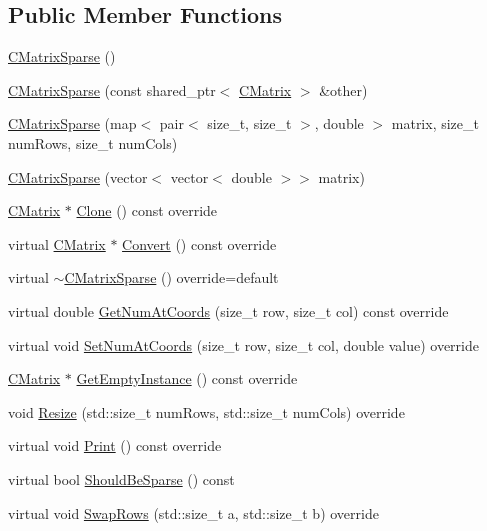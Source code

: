 \subsection*{Public Member Functions}
\begin{DoxyCompactItemize}
\item 
\hyperlink{classCMatrixSparse_a8b07f6b861304fccebc6229968a0baa0}{C\+Matrix\+Sparse} ()
\item 
\hyperlink{classCMatrixSparse_ab2dc89566f3cdcb626a04fb4c89db926}{C\+Matrix\+Sparse} (const shared\+\_\+ptr$<$ \hyperlink{classCMatrix}{C\+Matrix} $>$ \&other)
\item 
\hyperlink{classCMatrixSparse_a154a1f5510bcedba74fec1eeb6ab4af6}{C\+Matrix\+Sparse} (map$<$ pair$<$ size\+\_\+t, size\+\_\+t $>$, double $>$ matrix, size\+\_\+t num\+Rows, size\+\_\+t num\+Cols)
\item 
\hyperlink{classCMatrixSparse_a2477eb8b3d46d83f067fe3c6fcb37772}{C\+Matrix\+Sparse} (vector$<$ vector$<$ double $>$$>$ matrix)
\item 
\hyperlink{classCMatrix}{C\+Matrix} $\ast$ \hyperlink{classCMatrixSparse_a8074d01357ce15ce0392a95d17fed7ef}{Clone} () const override
\item 
virtual \hyperlink{classCMatrix}{C\+Matrix} $\ast$ \hyperlink{classCMatrixSparse_a1519d4cdef830a6df4d0ec900b4413c7}{Convert} () const override
\item 
virtual \hyperlink{classCMatrixSparse_a40f32c0d13b58937ecbb279b670e9ebc}{$\sim$\+C\+Matrix\+Sparse} () override=default
\item 
virtual double \hyperlink{classCMatrixSparse_a1f071b5ed04bb2fb015f97ce7074702d}{Get\+Num\+At\+Coords} (size\+\_\+t row, size\+\_\+t col) const override
\item 
virtual void \hyperlink{classCMatrixSparse_a675982946fbb61169c625e5eb5d2d2bd}{Set\+Num\+At\+Coords} (size\+\_\+t row, size\+\_\+t col, double value) override
\item 
\hyperlink{classCMatrix}{C\+Matrix} $\ast$ \hyperlink{classCMatrixSparse_a2f545baf72ad2974e1450f8653f9bd06}{Get\+Empty\+Instance} () const override
\item 
void \hyperlink{classCMatrixSparse_a83cd4fce61394f6c2b290bf06d0efd0a}{Resize} (std\+::size\+\_\+t num\+Rows, std\+::size\+\_\+t num\+Cols) override
\item 
virtual void \hyperlink{classCMatrixSparse_acf4a7e41666e6fb29e629c3a62a7fd8f}{Print} () const override
\item 
virtual bool \hyperlink{classCMatrixSparse_a780df7daf904384dadb5f3cd9bd81e40}{Should\+Be\+Sparse} () const 
\item 
virtual void \hyperlink{classCMatrixSparse_a09c9471dbb6d83f6f51f25cc24554293}{Swap\+Rows} (std\+::size\+\_\+t a, std\+::size\+\_\+t b) override
\end{DoxyCompactItemize}

